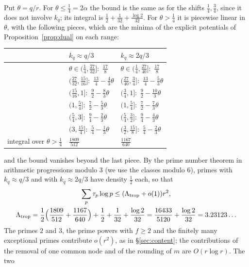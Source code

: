 Put $\theta=q/r$. For $\theta\le\frac14=2\alpha$ the bound is the same as for the shifts $\frac14,\frac34$,
since it does not involve $k_q$; its integral is $\frac12+\frac1{32}+\frac{\log2}{32}$. For $\theta>\frac14$ it is piecewise linear
in $\theta$, with the following pieces, which are the minima of the explicit potentials of Proposition~\ref{prop:dual}
on each range:
\begin{center}
\renewcommand{\arraystretch}{1.15}
\begin{tabular}{lll}
\toprule
 & $k_q\approx q/3$ & $k_q\approx 2q/3$\\
\midrule
 & $\theta\in(\tfrac14,\tfrac{27}{32}]$:\ $\tfrac{17}8$ & $\theta\in(\tfrac14,\tfrac{27}{40}]$:\ $\tfrac{17}8$\\
 & $(\tfrac{27}{32},\tfrac{15}{16}]$:\ $\tfrac{13}4-\tfrac43\theta$ & $(\tfrac{27}{40},\tfrac34]$:\ $\tfrac{13}4-\tfrac53\theta$\\
 & $(\tfrac{15}{16},1]$:\ $\tfrac92-\tfrac83\theta$ & $(\tfrac34,1]$:\ $\tfrac92-\tfrac{10}3\theta$\\
 & $(1,\tfrac54]$:\ $\tfrac72-\tfrac53\theta$ & $(1,\tfrac54]$:\ $\tfrac72-\tfrac73\theta$\\
 & $(\tfrac54,3]$:\ $\tfrac94-\tfrac23\theta$ & $(\tfrac54,\tfrac32]$:\ $\tfrac94-\tfrac43\theta$\\
 & $(3,\tfrac{15}4]$:\ $\tfrac54-\tfrac13\theta$ & $(\tfrac32,\tfrac{15}8]$:\ $\tfrac54-\tfrac23\theta$\\
\midrule
 integral over $\theta>\frac14$ & $\frac{1809}{512}$ & $\frac{1167}{640}$\\
\bottomrule
\end{tabular}
\end{center}
and the bound vanishes beyond the last piece. By the prime number theorem in arithmetic progressions modulo $3$ (we use
the classes modulo $6$), primes with $k_q\approx q/3$ and with $k_q\approx 2q/3$ have density $\frac12$ each, so that
\[
\begin{gathered}
 \sum_p\tau_p\log p\le(\Lambda_{\rm trop}+o(1))r^2,\\
 \Lambda_{\rm trop}=\frac12\Bigl(\frac{1809}{512}+\frac{1167}{640}\Bigr)+\frac12+\frac1{32}+\frac{\log2}{32}
 =\frac{16433}{5120}+\frac{\log2}{32}=3.23123\ldots
\end{gathered}
\]
The primes $2$ and $3$, the prime powers with $f\ge2$ and the finitely many exceptional primes contribute $o(r^2)$,
as in \S\ref{sec:content}; the contributions of the removal of one common node and of the rounding of $m$ are $O(r\log r)$. The two
